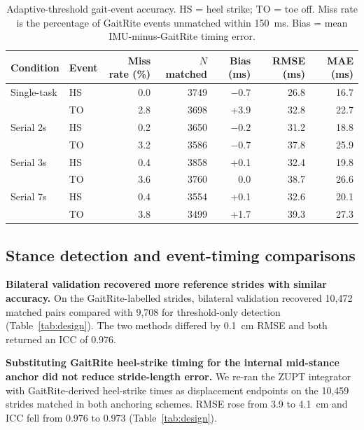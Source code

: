 \documentclass[fleqn,10pt,lineno]{wlpeerj}
\begin{document}
\begin{table}[!ht]
\centering
\caption{Adaptive-threshold gait-event accuracy. HS = heel strike; TO = toe off. Miss rate is the percentage of GaitRite events unmatched within 150~ms. Bias = mean IMU-minus-GaitRite timing error.}
\label{tab:events}
\small
\begin{tabular}{@{}llrrrrr@{}}
\toprule
Condition & Event & Miss rate (\%) & $N$ matched & Bias (ms) & RMSE (ms) & MAE (ms) \\
\midrule
Single-task & HS & 0.0 & 3749 & $-0.7$ & 26.8 & 16.7 \\
            & TO & 2.8 & 3698 & +3.9 & 32.8 & 22.7 \\
Serial 2s   & HS & 0.2 & 3650 & $-0.2$ & 31.2 & 18.8 \\
            & TO & 3.2 & 3586 & $-0.7$ & 37.8 & 25.9 \\
Serial 3s   & HS & 0.4 & 3858 & +0.1 & 32.4 & 19.8 \\
            & TO & 3.6 & 3760 & 0.0 & 38.7 & 26.6 \\
Serial 7s   & HS & 0.4 & 3554 & +0.1 & 32.6 & 20.1 \\
            & TO & 3.8 & 3499 & +1.7 & 39.3 & 27.3 \\
\bottomrule
\end{tabular}
\end{table}

\FloatBarrier
\subsection{Stance detection and event-timing comparisons}

\textbf{Bilateral validation recovered more reference strides with similar accuracy.} On the GaitRite-labelled strides, bilateral validation recovered 10{,}472 matched pairs compared with 9{,}708 for threshold-only detection (Table~\ref{tab:design}). The two methods differed by 0.1~cm RMSE and both returned an ICC of 0.976.

\textbf{Substituting GaitRite heel-strike timing for the internal mid-stance anchor did not reduce stride-length error.} We re-ran the ZUPT integrator with GaitRite-derived heel-strike times as displacement endpoints on the 10{,}459 strides matched in both anchoring schemes. RMSE rose from 3.9 to 4.1~cm and ICC fell from 0.976 to 0.973 (Table~\ref{tab:design}).
\end{document}
